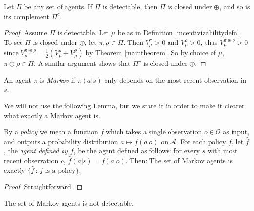 \documentclass[runningheads]{llncs}
\begin{document}
\begin{theorem}
\label{closuretheorem}
    Let $\Pi$ be any set of agents.
    If $\Pi$ is detectable, then $\Pi$ is closed under $\oplus$, and so
    is its complement $\Pi^c$.
\end{theorem}

\begin{proof}
    Assume $\Pi$ is detectable.
    Let $\mu$ be as in
    Definition \ref{incentivizabilitydefn}.
    To see $\Pi$ is closed under $\oplus$, let $\pi,\rho\in\Pi$.
    Then $V^\pi_\mu>0$ and $V^\rho_\mu>0$, thus
    $V^{\pi\oplus\rho}_\mu>0$ since
    $V^{\pi\oplus\rho}_\mu=\frac12(V^\pi_\mu+V^\rho_\mu)$ by Theorem
    \ref{maintheorem}.
    So by choice of $\mu$, $\pi\oplus\rho\in \Pi$.
    A similar argument shows that $\Pi^c$ is closed under $\oplus$.
\end{proof}

\begin{definition}
    An agent $\pi$ is \emph{Markov} if
    $\pi(a|s)$ only depends on the most recent observation in $s$.
\end{definition}

We will not use the following Lemma, but we state it in order to
make it clearer what exactly a Markov agent is.

\begin{lemma}
    By a \emph{policy} we mean a function $f$ which takes a single observation
    $o\in\mathcal O$ as input, and outputs a probability distribution
    $a\mapsto f(a|o)$ on $\mathcal A$.
    For each policy $f$, let $\hat f$, the \emph{agent defined by $f$},
    be the agent defined as follows:
    for every $s$ with most recent observation $o$,
    $\hat f(a|s)=f(a|o)$.
    Then:
    The set of Markov agents is exactly $\{\hat f\,:\,\mbox{$f$ is a policy}\}$.
\end{lemma}

\begin{proof}
    Straightforward.
\end{proof}

\begin{theorem}
\label{markovcorollary}
    The set of Markov agents is not detectable.
\end{theorem}
\end{document}
